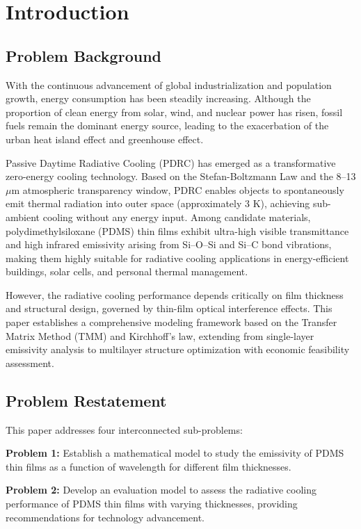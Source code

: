 \section{Introduction}

\subsection{Problem Background}

With the continuous advancement of global industrialization and population growth, energy consumption has been steadily increasing. Although the proportion of clean energy from solar, wind, and nuclear power has risen, fossil fuels remain the dominant energy source, leading to the exacerbation of the urban heat island effect and greenhouse effect.

Passive Daytime Radiative Cooling (PDRC) has emerged as a transformative zero-energy cooling technology. Based on the Stefan-Boltzmann Law and the 8--13 $\mu$m atmospheric transparency window, PDRC enables objects to spontaneously emit thermal radiation into outer space (approximately 3 K), achieving sub-ambient cooling without any energy input. Among candidate materials, polydimethylsiloxane (PDMS) thin films exhibit ultra-high visible transmittance and high infrared emissivity arising from Si--O--Si and Si--C bond vibrations, making them highly suitable for radiative cooling applications in energy-efficient buildings, solar cells, and personal thermal management.

However, the radiative cooling performance depends critically on film thickness and structural design, governed by thin-film optical interference effects. This paper establishes a comprehensive modeling framework based on the Transfer Matrix Method (TMM) and Kirchhoff's law, extending from single-layer emissivity analysis to multilayer structure optimization with economic feasibility assessment.

\subsection{Problem Restatement}

This paper addresses four interconnected sub-problems:

\textbf{Problem 1:} Establish a mathematical model to study the emissivity of PDMS thin films as a function of wavelength for different film thicknesses.

\textbf{Problem 2:} Develop an evaluation model to assess the radiative cooling performance of PDMS thin films with varying thicknesses, providing recommendations for technology advancement.

